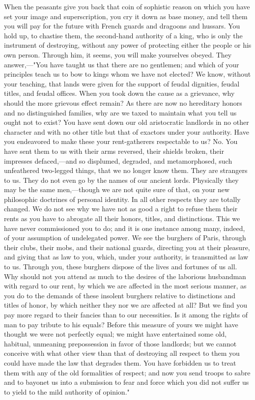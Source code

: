 When the peasants give you back that coin of sophistic reason on which you have set your image and superscription, you cry it down as base money, and tell them you will pay for the future with French guards and dragoons and hussars. You hold up, to chastise them, the second-hand authority of a king, who is only the instrument of destroying, without any power of protecting either the people or his own person. Through him, it seems, you will make yourselves obeyed. They answer,—"You have taught us that there are no gentlemen; and which of your principles teach us to bow to kings whom we have not elected? We know, without your teaching, that lands were given for the support of feudal dignities, feudal titles, and feudal offices. When you took down the cause as a grievance, why should the more grievous effect remain? As there are now no hereditary honors and no distinguished families, why are we taxed to maintain what you tell us ought not to exist? You have sent down our old aristocratic landlords in no other character and with no other title but that of exactors under your authority. Have you endeavored to make these your rent-gatherers respectable to us? No. You have sent them to us with their arms reversed, their shields broken, their impresses defaced,—and so displumed, degraded, and metamorphosed, such unfeathered two-legged things, that we no longer know them. They are strangers to us. They do not even go by the names of our ancient lords. Physically they may be the same men,—though we are not quite sure of that, on your new philosophic doctrines of personal identity. In all other respects they are totally changed. We do not see why we have not as good a right to refuse them their rents as you have to abrogate all their honors, titles, and distinctions. This we have never commissioned you to do; and it is one instance among many, indeed, of your assumption of undelegated power. We see the burghers of Paris, through their clubs, their mobs, and their national guards, directing you at their pleasure, and giving that as law to you, which, under your authority, is transmitted as law to us. Through you, these burghers dispose of the lives and fortunes of us all. Why should not you attend as much to the desires of the laborious husbandman with regard to our rent, by which we are affected in the most serious manner, as you do to the demands of these insolent burghers relative to distinctions and titles of honor, by which neither they nor we are affected at all? But we find you pay more regard to their fancies than to our necessities. Is it among the rights of man to pay tribute to his equals? Before this measure of yours we might have thought we were not perfectly equal; we might have entertained some old, habitual, unmeaning prepossession in favor of those landlords; but we cannot conceive with what other view than that of destroying all respect to them you could have made the law that degrades them. You have forbidden us to treat them with any of the old formalities of respect; and now you send troops to sabre and to bayonet us into a submission to fear and force which you did not suffer us to yield to the mild authority of opinion."

